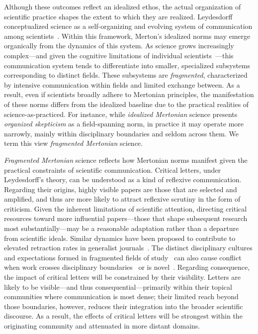 \documentclass[12pt]{article} %
\begin{document}
Although these outcomes reflect an idealized ethos, the actual organization of scientific practice shapes the extent to which they are realized.
Leydesdorff conceptualized science as a self-organizing and evolving system of communication among scientists~\cite{leydesdorff2001sociological}.
Within this framework, Merton’s idealized norms may emerge organically from the dynamics of this system.
As science grows increasingly complex---and given the cognitive limitations of individual scientists~\cite{pan2018myopia}---this communication system tends to differentiate into smaller, specialized subsystems corresponding to distinct fields.
These subsystems are \textit{fragmented}, characterized by intensive communication within fields and limited exchange between.
As a result, even if scientists broadly adhere to Mertonian principles, the manifestation of these norms differs from the idealized baseline due to the practical realities of science-as-practiced. 
For instance, while \textit{idealized Mertonian} science presents \textit{organized skepticism} as a field-spanning norm, in practice it may operate more narrowly, mainly within disciplinary boundaries and seldom across them.
We term this view \textit{fragmented Mertonian} science.

\textit{Fragmented Mertonian} science reflects how Mertonian norms manifest given the practical constraints of scientific communication.
Critical letters, under Leydesdorff's theory, can be understood as a kind of reflexive communication.
Regarding their origins, highly visible papers are those that are selected and amplified, and thus are more likely to attract reflexive scrutiny in the form of criticism. 
Given the inherent limitations of scientific attention, directing critical resources toward more influential papers—those that shape subsequent research most substantially—may be a reasonable adaptation rather than a departure from scientific ideals.
Similar dynamics have been proposed to contribute to elevated retraction rates in generalist journals~\cite{cokol_2007_retracted}. 
The distinct disciplinary cultures and expectations formed in fragmented fields of study~\cite{leydesdorff2001sociological,knorr1999epistemic} can also cause conflict when work crosses disciplinary boundaries~\cite{mcleish_2016_interdisciplinary, brohman_2016_interdisciplinary} or is novel~\cite{boudreau_2016_looking,li_2017_expertise,siler_2016_review,lane_2022_conservatism,ayoubi_2021_novel}.
Regarding consequence, the impact of critical letters will be constrained by their visibility.
Letters are likely to be visible---and thus consequential---primarily within their topical communities where communication is most dense; their limited reach beyond those boundaries, however, reduces their integration into the broader scientific discourse. 
As a result, the effects of critical letters will be strongest within the originating community and attenuated in more distant domains.
\end{document}
